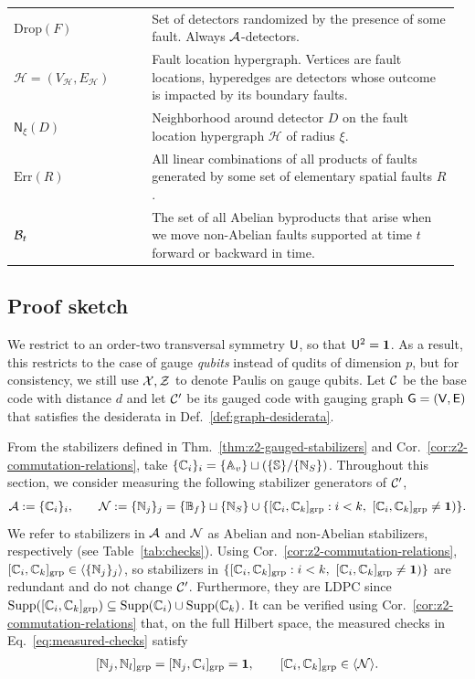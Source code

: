 \documentclass[11pt]{article}
\begin{document}
\begin{longtable}{@{}p{0.30\linewidth}p{0.67\linewidth}@{}}
        $\text{Drop}(F)$ & Set of detectors randomized by the presence of some fault. Always $\mathcal{A}$-detectors. \\
        $\mathcal{H} = (V_\mathcal{H}, E_\mathcal{H})$ & Fault location hypergraph. Vertices are fault locations, hyperedges are detectors whose outcome is impacted by its boundary faults. \\
        $\mathsf{N}_\xi (D)$ & Neighborhood around detector $D$ on the fault location hypergraph $\mathcal{H}$ of radius $\xi$. \\
        $\mathrm{Err}(R)$ & All linear combinations of all products of faults generated by some set of elementary spatial faults $R$. \\
        $\mathcal{B}_t$ & The set of all Abelian byproducts that arise when we move non-Abelian faults supported at time $t$ forward or backward in time. \\
        
\end{longtable}
\endgroup


\subsection{Proof sketch}

We restrict to an order-two transversal symmetry $\mathsf{U}$, so that $\mathsf{U}^2 = \mathbf{1}$. As a result, this restricts to the case of gauge \textit{qubits} instead of qudits of dimension $p$, but for consistency, we still use $\mathcal{X},\mathcal{Z}$ to denote Paulis on gauge qubits.
Let $\mathcal{C}$ be the base code with distance $d$ and let $\mathcal{C}'$ be its gauged code with gauging graph $\mathsf{G} =(\mathsf{V},\mathsf{E})$ that satisfies the desiderata in Def.~\ref{def:graph-desiderata}.

From the stabilizers defined in Thm.~\ref{thm:z2-gauged-stabilizers} and Cor.~\ref{cor:z2-commutation-relations}, take $\{\mathbb{C}_{i}\}_i = \{\mathbb{A}_v\} \sqcup (\{\mathbb{S}\}/\{\mathbb{N}_S\})$.
Throughout this section, we consider measuring the following stabilizer generators of $\mathcal{C}'$,
\begin{align}
\label{eq:measured-checks}
    \mathcal{A} := \{\mathbb{C}_{i}\}_{i},\qquad \mathcal{N}:=\{\mathbb{N}_{j}\}_j = \{\mathbb{B}_f\} \sqcup \{\mathbb{N}_S\} \cup \{[ \mathbb{C}_{i}, \mathbb{C}_{k} ]_{\text{grp}}:i<k,\  [ \mathbb{C}_{i}, \mathbb{C}_{k} ]_{\text{grp}} \neq \mathbf{1}
    )\} .
\end{align}
We refer to stabilizers in $\mathcal{A}$ and $\mathcal{N}$ as Abelian and non-Abelian stabilizers, respectively (see Table~\ref{tab:checks}).
Using Cor.~\ref{cor:z2-commutation-relations}, $[ \mathbb{C}_{i}, \mathbb{C}_{k} ]_{\text{grp}}\in \langle \{\mathbb{N}_{j}\}_j \rangle$, so stabilizers in $\{[ \mathbb{C}_{i}, \mathbb{C}_{k} ]_{\text{grp}}:i<k,\  [ \mathbb{C}_{i}, \mathbb{C}_{k} ]_{\text{grp}} \neq \mathbf{1})\} $ are redundant and do not change $\mathcal{C}'$. 
Furthermore, they are LDPC since $\operatorname{Supp}([ \mathbb{C}_{i}, \mathbb{C}_{k} ]_{\text{grp}})\subseteq \operatorname{Supp}(\mathbb{C}_{i})\cup \operatorname{Supp}(\mathbb{C}_{k})$. 
It can be verified using Cor.~\ref{cor:z2-commutation-relations} that, on the full Hilbert space, the measured checks in Eq.~\eqref{eq:measured-checks} satisfy
\begin{align}
    [ \mathbb{N}_{j}, \mathbb{N}_{l} ]_{\text{grp}}=[ \mathbb{N}_{j}, \mathbb{C}_{i} ]_{\text{grp}}=\mathbf{1},\qquad [ \mathbb{C}_{i}, \mathbb{C}_{k} ]_{\text{grp}}\in \langle \mathcal{N} \rangle.
\end{align}
\noindent
\end{document}
